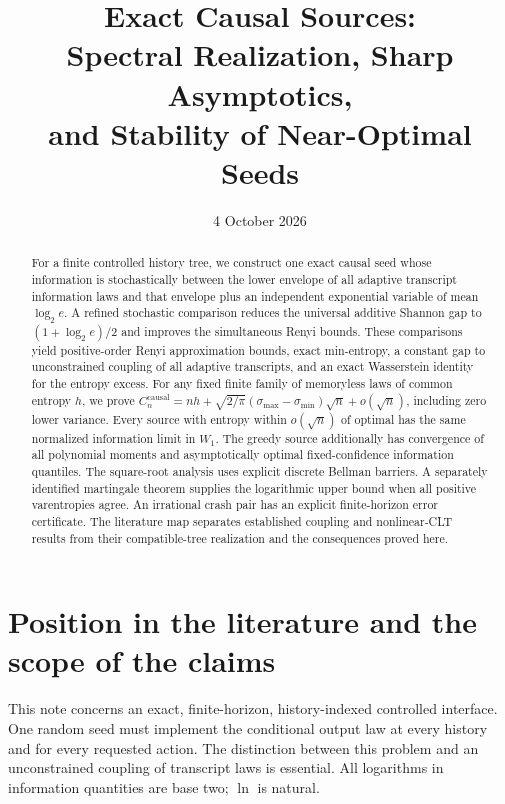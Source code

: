 \documentclass[11pt,a4paper]{article}
\title{Exact Causal Sources:\\Spectral Realization, Sharp Asymptotics,\\and Stability of Near-Optimal Seeds}
\author{}
\date{4 October 2026}
\newcommand{\causal}{\mathrm{causal}}
\begin{document}
\maketitle
\begin{abstract}
For a finite controlled history tree, we construct one exact causal seed
whose information is stochastically between the lower envelope of all
adaptive transcript information laws and that envelope plus an independent
exponential variable of mean $\log_2e$. A refined stochastic comparison
reduces the universal additive Shannon gap to $(1+\log_2e)/2$ and
improves the simultaneous Renyi bounds. These comparisons yield
positive-order Renyi approximation bounds, exact min-entropy, a constant
gap to unconstrained coupling of all adaptive transcripts, and an exact
Wasserstein identity for the entropy excess. For any fixed finite family
of memoryless laws of common entropy $h$, we prove
$C_n^{\causal}=nh+\sqrt{2/\pi}(\sigma_{\max}-\sigma_{\min})\sqrt n+o(\sqrt n)$,
including zero lower variance. Every source with entropy within
$o(\sqrt n)$ of optimal has the same normalized information limit in
$W_1$. The greedy source additionally has convergence of all polynomial
moments and asymptotically optimal fixed-confidence information quantiles.
The square-root analysis uses explicit discrete Bellman barriers.
A separately identified martingale theorem supplies the logarithmic upper
bound when all positive varentropies agree. An irrational crash pair has
an explicit finite-horizon error certificate. The literature map separates
established coupling and nonlinear-CLT results from their compatible-tree
realization and the consequences proved here.
\end{abstract}
\tableofcontents
\newpage

\section{Position in the literature and the scope of the claims}\label{sec:literature}
This note concerns an exact, finite-horizon, history-indexed controlled
interface. One random seed must implement the conditional output law at
every history and for every requested action. The distinction between this
problem and an unconstrained coupling of transcript laws is essential.
All logarithms in information quantities are base two; $\ln$ is natural.
\end{document}
